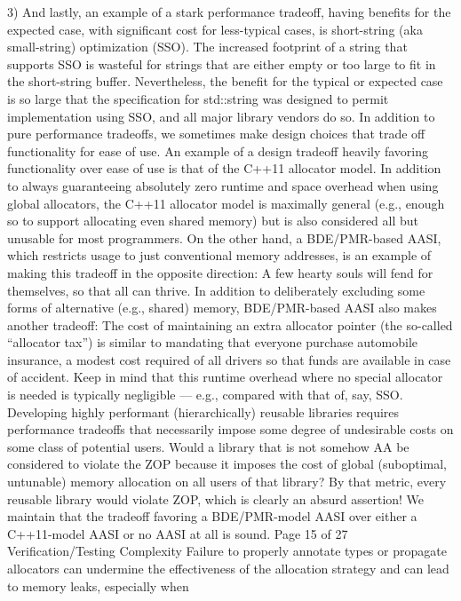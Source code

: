 3) And lastly, an example of a stark performance tradeoff, having benefits for the
expected case, with significant cost for less-typical cases, is short-string (aka
small-string) optimization (SSO). The increased footprint of a string that
supports SSO is wasteful for strings that are either empty or too large to fit in
the short-string buffer. Nevertheless, the benefit for the typical or expected
case is so large that the specification for std::string was designed to permit
implementation using SSO, and all major library vendors do so.
In addition to pure performance tradeoffs, we sometimes make design choices that
trade off functionality for ease of use. An example of a design tradeoff heavily
favoring functionality over ease of use is that of the C++11 allocator model. In
addition to always guaranteeing absolutely zero runtime and space overhead when
using global allocators, the C++11 allocator model is maximally general (e.g., enough
so to support allocating even shared memory) but is also considered all but
unusable for most programmers. On the other hand, a BDE/PMR-based AASI,
which restricts usage to just conventional memory addresses, is an example of
making this tradeoff in the opposite direction: A few hearty souls will fend for
themselves, so that all can thrive.
In addition to deliberately excluding some forms of alternative (e.g., shared) memory,
BDE/PMR-based AASI also makes another tradeoff: The cost of maintaining an
extra allocator pointer (the so-called “allocator tax”) is similar to mandating that
everyone purchase automobile insurance, a modest cost required of all drivers so
that funds are available in case of accident. Keep in mind that this runtime
overhead where no special allocator is needed is typically negligible — e.g.,
compared with that of, say, SSO.
Developing highly performant (hierarchically) reusable libraries requires
performance tradeoffs that necessarily impose some degree of undesirable costs on
some class of potential users. Would a library that is not somehow AA be considered
to violate the ZOP because it imposes the cost of global (suboptimal, untunable)
memory allocation on all users of that library? By that metric, every reusable library
would violate ZOP, which is clearly an absurd assertion! We maintain that the
tradeoff favoring a BDE/PMR-model AASI over either a C++11-model AASI or no
AASI at all is sound.
Page 15 of 27
Verification/Testing Complexity
Failure to properly annotate types or propagate allocators can undermine the
effectiveness of the allocation strategy and can lead to memory leaks, especially when
